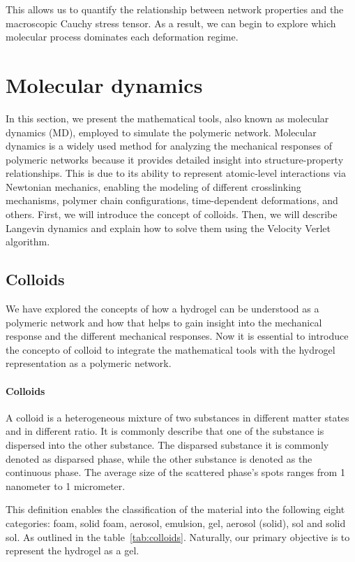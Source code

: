 This allows us to quantify the relationship between network properties and the macroscopic Cauchy stress tensor. 
As a result, we can begin to explore which molecular process dominates each deformation regime.

\section{Molecular dynamics}

In this section, we present the mathematical tools, also known as molecular dynamics (MD), employed to simulate the polymeric network.
Molecular dynamics is a widely used method for analyzing the mechanical responses of polymeric networks because it provides detailed insight into structure-property relationships.
This is due to its ability to represent atomic-level interactions via Newtonian mechanics, enabling the modeling of different crosslinking mechanisms, polymer chain configurations, time-dependent deformations, and others.
First, we will introduce the concept of colloids. 
Then, we will describe Langevin dynamics and explain how to solve them using the Velocity Verlet algorithm.

\subsection{Colloids}

We have explored the concepts of how a hydrogel can be understood as a polymeric network and how that helps to gain insight into the mechanical response and the different mechanical responses.
Now it is essential to introduce the concepto of colloid to integrate the mathematical tools with the hydrogel representation as a polymeric network.

\paragraph{Colloids} A colloid is a heterogeneous mixture of two substances in different matter states and in different ratio\citep{castaneda-priegoColloidalSoftMatter2021}.
It is commonly describe that one of the substance is dispersed into the other substance.
The disparsed substance it is commonly denoted as disparsed phase, while the other substance is denoted as the continuous phase.
The average size of the scattered phase's spots ranges from 1 nanometer to 1 micrometer.

This definition enables the classification of the material into the following eight categories:
foam, solid foam,
aerosol, emulsion, gel,
aerosol (solid), sol and solid sol.
As outlined in the table~\ref{tab:colloids}.
Naturally, our primary objective is to represent the hydrogel as a gel.


